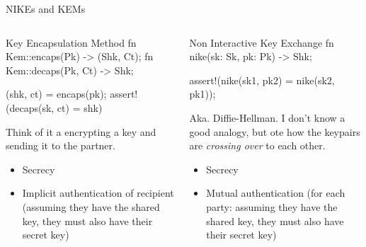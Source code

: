 \begin{frame}[fragile,t]{NIKEs and KEMs}
  \vspace{-1.5em}
  \begin{columns}[t]
    \begin{column}{.5\linewidth}
\begin{rustblock}{Key Encapsulation Method}
fn Kem::encaps(Pk) -> (Shk, Ct);
fn Kem::decaps(Pk, Ct) -> Shk;

(shk, ct) = encaps(pk);
assert!(decaps(sk, ct) = shk)
\end{rustblock}
        \vspace{1em}
        Think of it a encrypting a key and sending it
        to the partner.

        \vspace{0.7em}
        \begin{itemize}
          \item Secrecy
          \item Implicit authentication of recipient
            (assuming they have the shared key, they must
            also have their secret key)
        \end{itemize}
    \end{column}

    \begin{column}{.5\linewidth}
\begin{rustblock}{Non Interactive Key Exchange}
fn nike(sk: Sk, pk: Pk) -> Shk;

assert!(nike(sk1, pk2) = nike(sk2, pk1));
\end{rustblock}

        \vspace{1em}
        Aka. Diffie-Hellman.
        I don't know a good analogy, but ote how the
        keypairs are \emph{crossing over} to each other.

        \vspace{0.7em}
        \begin{itemize}
          \item Secrecy
          \item Mutual authentication
            (for each party: assuming they have the shared key, they must
            also have their secret key)
        \end{itemize}
    \end{column}

  \end{columns}
\end{frame}




